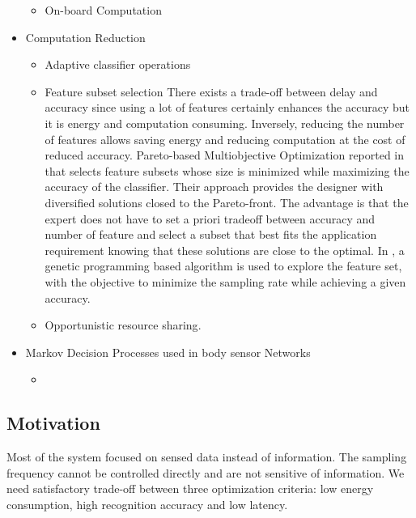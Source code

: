 \documentclass[letterpaper, 10pt, conference]{IEEEtran} %
\begin{document}
\begin{itemize}
\begin{itemize}
    \item  On-board Computation\cite{chu2011balancing}
\end{itemize}
\item  Computation Reduction
\begin{itemize}
    \item Adaptive classifier operations\cite{wang2013energy}
    \item  Feature subset selection\cite{chu2011balancing}
    There exists a trade-off between delay and accuracy since using a lot of features certainly
enhances the accuracy but it is energy and computation consuming. Inversely, reducing the number of features allows saving
energy and reducing computation at the cost of reduced accuracy. Pareto-based Multiobjective Optimization reported in \cite{cilla2009creating} that selects feature subsets whose size is minimized
while maximizing the accuracy of the classifier. Their approach provides the designer with diversified solutions closed to
the Pareto-front. The advantage is that the expert does not have to set a priori tradeoff between accuracy and number of
feature and select a subset that best fits the application requirement knowing that these solutions are
close to the optimal. In \cite{qi2013adasense}, a genetic programming based algorithm is used to explore the feature set, with the objective to
minimize the sampling rate while achieving a given accuracy.
    
    \item Opportunistic resource sharing\cite{cilla2009creating}.
\end{itemize}
\item  Markov Decision Processes used in body sensor Networks
\begin{itemize}
    \item \cite{Alsheikh2015MDP,au2011carer,zois2013unified,pietrabissa2013optimal}
    
\end{itemize}
 
\end{itemize}


\subsection{Motivation}

Most of the system focused on sensed data instead of information.  The sampling frequency cannot be controlled directly and are not sensitive of information. We need satisfactory trade-off between three optimization criteria: low energy consumption, high recognition accuracy and low latency.
\end{document}

